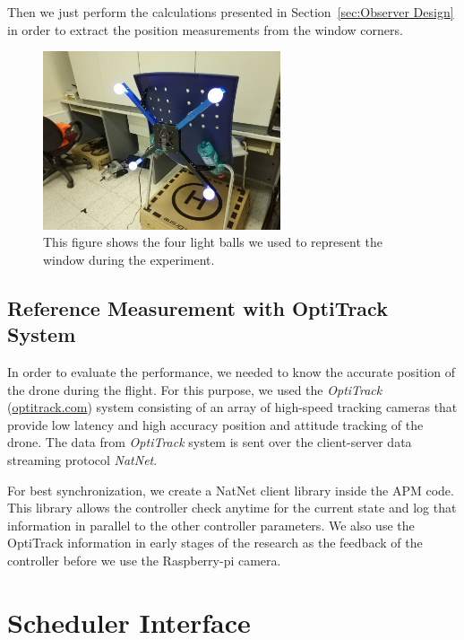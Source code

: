 \documentclass[ twoside, 12pt ]{article}
\begin{document}
Then we just perform the calculations presented in Section~\ref{sec:Observer Design} in order to extract the position measurements from the window corners.

\begin{figure} %
    \centerline{\includegraphics[width=70mm]{window_lights.jpg}}
    \caption{This figure shows the four light balls we used to represent the window during the experiment.}
    \label{fig:window_lights}
\end{figure}

\subsection{Reference Measurement with OptiTrack System}
\label{sec:Experiment setup-optitrack}
In order to evaluate the performance, we needed to know the accurate position of the drone during the flight. For this purpose, we used the \textit{OptiTrack} (\url{optitrack.com}) system 
consisting of an array of high-speed tracking cameras that provide low latency and high accuracy position and attitude tracking of the drone. The data from \textit{OptiTrack} system is sent over the client-server data streaming protocol \textit{NatNet}.

For best synchronization, we create a NatNet client library inside the APM code. This library allows the controller check anytime for the current state and log that information in parallel to the other controller parameters.
We also use the OptiTrack information in early stages of the research as the feedback of the controller before we use the Raspberry-pi camera.

\section{Scheduler Interface}
\label{sec:scheduler}
\end{document}
